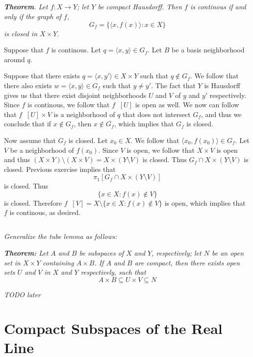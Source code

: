 \documentclass[11pt,oneside,titlepage]{book}
\DeclareMathOperator \inv {^{-1}}
\newcommand{\eangle}[1]{\langle #1 \rangle}
\newcommand{\set}[1]{\{ #1 \}}
\begin{document}
\subsection{}

\textit{\textbf{Theorem}. Let $f: X \to Y$; let $Y$ be compact Hausdorff. Then $f$ is
  continous if and only if the graph of $f$,
  $$G_f = \set{\eangle{x, f(x)}: x \in X}$$
  is closed in $X \times Y$.}

Suppose that $f$ is continous. Let $q = \eangle{x, y} \in G_f$. Let $B$ be a
basis neighborhood around $q$.

Suppose that there exists $q = \eangle{x, y'} \in X \times Y$ such that 
$q \notin G_f$. We follow that there also exists $w = \eangle{x, y} \in G_f$ such that
$y \neq y'$. The fact that $Y$ is Hausdorff gives us that there exist disjoint neighborhoods
$U$ and $V$ of $y$ and $y'$ respectively. Since $f$ is continous, we follow that $f\inv[U]$
is open as well. We now can follow that $f\inv[U] \times V$ is a neighborhood of $q$
that does not intersect $G_f$, and thus we conclude that
if $x \notin G_f$, then $x \notin \overline{G_f}$, which implies that $G_f$ is closed.

Now assume that $G_f$ is closed. Let $x_0 \in X$. We follow that $\eangle{x_0, f(x_0)} \in G_f$.
Let $V$ be a neighborhood of $f(x_0)$. Since $V$ is open, we follow that $X \times V$
is open and thus $(X \times Y) \setminus (X \times V) = X \times (Y \setminus V)$
is closed. Thus $G_f \cap X \times (Y \setminus V)$ is closed. Previous
exercise implies that
$$\pi_1[G_f \cap X \times (Y \setminus V)]$$
is closed. Thus
$$\set{x \in X: f(x) \notin V}$$
is closed. Therefore $f\inv[V] = X \setminus \set{x \in X: f(x) \notin V}$ is open,
which implies that $f$ is continous, as desired.

\subsection{}

\textit{Generalize the tube lemma as follows: }

\textit{\textbf{Theorem: } Let $A$ and $B$ be subspaces of $X$ and $Y$, respectively; let $N$
  be an open set in $X \times Y$ containing $A \times B$. If $A$ and $B$ are compact, then there
  exists open sets $U$ and $V$  in $X$ and $Y$ respectively, such that
  $$A \times B \subseteq U \times V \subseteq N$$}

\textit{TODO later}

\section{Compact Subspaces of the Real Line}
\end{document}
